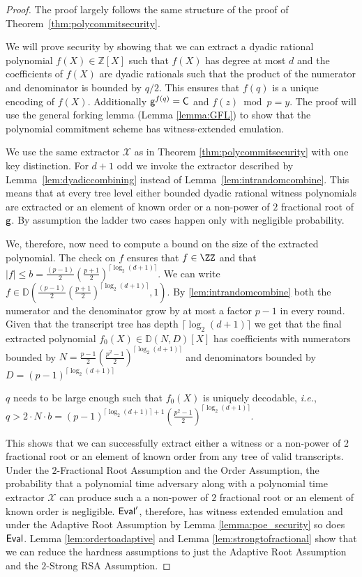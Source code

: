 \begin{proof}
The proof largely follows the same structure of the proof of Theorem~\ref{thm:polycommitsecurity}.
	
We will prove security by showing that we can extract a dyadic rational polynomial $f(X)\in \mathbb{Z}[X]$ such that $f(X)$ has degree at most $d$ and the coefficients of $f(X)$ are dyadic rationals such that the product of the numerator and denominator is bounded by $q/2$. This ensures that $f(q)$ is a unique encoding of $f(X)$. Additionally $\mathsf{g}^{f(q)}=\mathsf{C}$ and $f(z) \bmod p=y$. The proof will use the general forking lemma (Lemma \ref{lemma:GFL}) to show that the polynomial commitment scheme has witness-extended emulation. 

We use the same extractor $\mathcal{X}$ as in Theorem \ref{thm:polycommitsecurity} with one key distinction. 
For $d+1$ odd we invoke the extractor described by Lemma~\ref{lem:dyadiccombining} instead of Lemma~\ref{lem:intrandomcombine}. 
This means that at every tree level either bounded dyadic rational witness polynomials are extracted or an element of known order or a non-power of $2$ fractional root of $\mathsf{g}$. By assumption the ladder two cases happen only with negligible probability.

We, therefore, now need to compute a bound on the size of the extracted polynomial. 
The check on $f$ ensures that $f\in \ZZ$ and that $|f|\leq b=\frac{(p-1)}{2} (\frac{p+1}{2})^{\lceil \log_2(d+1)\rceil}$. We can write $f\in\mathbb{D}(\frac{(p-1)}{2} (\frac{p+1}{2})^{\lceil \log_2(d+1)\rceil},1)$. By \ref{lem:intrandomcombine} both the numerator and the denominator grow by at most a factor $p-1$ in every round.
Given that the transcript tree has depth $\lceil \log_2(d+1)\rceil$ we get that the final extracted polynomial $f_0(X)\in \mathbb{D}(N,D)[X]$ has coefficients with numerators bounded by $N= \frac{p-1}{2}(\frac{p^2-1}{2})^{\lceil \log_2(d+1)\rceil}$ and denominators bounded by $D=(p-1)^{\lceil \log_2(d+1)\rceil}$

$q$ needs to be large enough such that $f_0(X)$ is uniquely decodable, \emph{i.e.}, $q>2\cdot N\cdot b=(p-1)^{\lceil \log_2(d+1)\rceil+1}(\frac{p^2-1}{2})^{\lceil \log_2(d+1)\rceil}$.

This shows that we can successfully extract either a witness or a non-power of $2$ fractional root or an element of known order from any tree of valid transcripts.
Under the $2$-Fractional Root Assumption and the Order Assumption, the probability that a polynomial time adversary along with a polynomial time extractor $\mathcal{X}$ can produce such a a  non-power of $2$ fractional root or an element of known order is negligible. $\textsf{{Eval}}'$, therefore, has witness extended emulation and under the Adaptive Root Assumption by Lemma \ref{lemma:poe_security} so does $\textsf{{Eval}}$.
Lemma \ref{lem:ordertoadaptive} and Lemma \ref{lem:strongtofractional} show that we can reduce the hardness assumptions to just the Adaptive Root Assumption and the  $2$-Strong RSA Assumption.
\end{proof}

